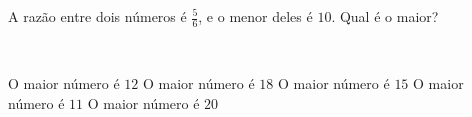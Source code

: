 \parbox{\linewidth}{

A razão entre dois números é $\frac{5}{6}$, e o menor deles é $10$. Qual é o maior?}\vspace{2mm}\\\parbox{\linewidth}{

O maior número é $12$
O maior número é $18$
O maior número é $15$
O maior número é $11$
O maior número é $20$

}

